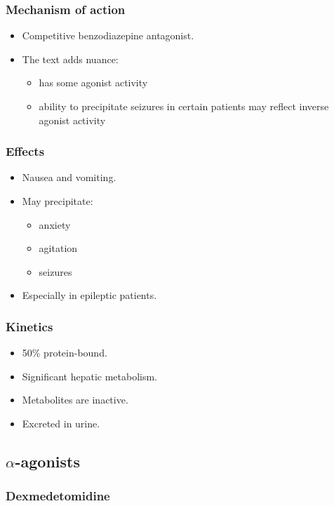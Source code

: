 \documentclass[11pt,a4paper]{article}
\begin{document}
\subsubsection{Mechanism of action}
\begin{itemize}
  \item Competitive benzodiazepine antagonist.
  \item The text adds nuance:
  \begin{itemize}
    \item has some agonist activity
    \item ability to precipitate seizures in certain patients may reflect inverse agonist activity
  \end{itemize}
\end{itemize}

\subsubsection{Effects}
\begin{itemize}
  \item Nausea and vomiting.
  \item May precipitate:
  \begin{itemize}
    \item anxiety
    \item agitation
    \item seizures
  \end{itemize}
  \item Especially in epileptic patients.
\end{itemize}

\subsubsection{Kinetics}
\begin{itemize}
  \item 50\% protein-bound.
  \item Significant hepatic metabolism.
  \item Metabolites are inactive.
  \item Excreted in urine.
\end{itemize}

\subsection{$\alpha$-agonists}

\subsubsection{Dexmedetomidine}
\end{document}
